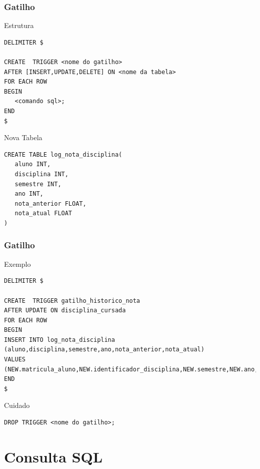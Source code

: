 \documentclass{beamer}
\begin{document}
\begin{frame}[fragile]
\frametitle{Gatilho}

\begin{block}{Estrutura}
	\begin{lstlisting}
DELIMITER $

CREATE  TRIGGER <nome do gatilho> 
AFTER [INSERT,UPDATE,DELETE] ON <nome da tabela> 
FOR EACH ROW 
BEGIN 
   <comando sql>;
END
$
	\end{lstlisting}
\end{block}\vfill

\begin{exampleblock}{Nova Tabela}
	\begin{lstlisting}
CREATE TABLE log_nota_disciplina(
   aluno INT,
   disciplina INT,
   semestre INT,
   ano INT,
   nota_anterior FLOAT,
   nota_atual FLOAT
)
	\end{lstlisting}
\end{exampleblock}
\end{frame}

\begin{frame}[fragile]
\frametitle{Gatilho}

\begin{exampleblock}{Exemplo}
	\begin{lstlisting}
DELIMITER $

CREATE  TRIGGER gatilho_historico_nota 
AFTER UPDATE ON disciplina_cursada 
FOR EACH ROW 
BEGIN 
INSERT INTO log_nota_disciplina (aluno,disciplina,semestre,ano,nota_anterior,nota_atual) 
VALUES
(NEW.matricula_aluno,NEW.identificador_disciplina,NEW.semestre,NEW.ano,OLD.nota,NEW.nota); 
END
$
	\end{lstlisting}
\end{exampleblock}\vfill

\begin{alertblock}{Cuidado}
	\begin{lstlisting}
DROP TRIGGER <nome do gatilho>;
	\end{lstlisting}
\end{alertblock}
\end{frame}

\section{Consulta SQL}
\end{document}
